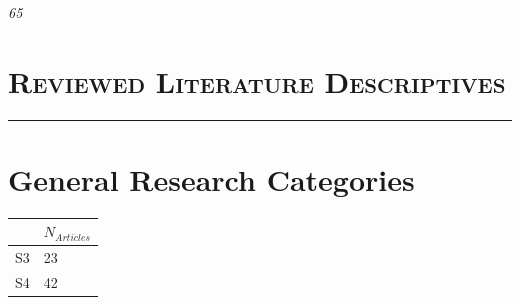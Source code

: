 \documentclass[]{tufte-handout}
\newenvironment{Shaded}{}{}
\newcommand{\KeywordTok}[1]{\textbf{{#1}}}
\newcommand{\DataTypeTok}[1]{\underline{{#1}}}
\newcommand{\StringTok}[1]{{#1}}
\newcommand{\NormalTok}[1]{{#1}}
\newcommand{\Frule}{
    \vspace*{-1em}
    \begin{fullwidth}\textcolor{blublk}{\rule{\linewidth}{0.2mm}}\end{fullwidth}
}
\begin{document}
\emph{65}

\begin{Shaded}
\end{Shaded}

\newpage

\section{\texorpdfstring{\LARGE{\textsc{Reviewed Literature Descriptives}}}{}}\label{section}

\Frule

\section{General Research Categories}\label{general-research-categories}

\begin{Shaded}
\end{Shaded}

\begin{longtable}[]{@{}ll@{}}
\toprule
\begin{minipage}[b]{0.07\columnwidth}\raggedright\strut
\strut
\end{minipage} & \begin{minipage}[b]{0.21\columnwidth}\raggedright\strut
\(N_{Articles}\)\strut
\end{minipage}\tabularnewline
\midrule
\endhead
\begin{minipage}[t]{0.07\columnwidth}\raggedright\strut
S3\strut
\end{minipage} & \begin{minipage}[t]{0.21\columnwidth}\raggedright\strut
23\strut
\end{minipage}\tabularnewline
\begin{minipage}[t]{0.07\columnwidth}\raggedright\strut
S4\strut
\end{minipage} & \begin{minipage}[t]{0.21\columnwidth}\raggedright\strut
42\strut
\end{minipage}\tabularnewline
\bottomrule
\end{longtable}
\end{document}
